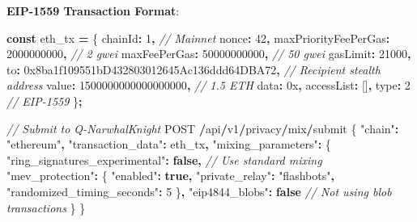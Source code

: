 \documentclass[
  11pt,
]{article}
\newenvironment{Shaded}{\begin{snugshade}}{\end{snugshade}}
\newcommand{\CommentTok}[1]{\textcolor[rgb]{0.56,0.35,0.01}{\textit{#1}}}
\newcommand{\DataTypeTok}[1]{\textcolor[rgb]{0.13,0.29,0.53}{#1}}
\newcommand{\DecValTok}[1]{\textcolor[rgb]{0.00,0.00,0.81}{#1}}
\newcommand{\KeywordTok}[1]{\textcolor[rgb]{0.13,0.29,0.53}{\textbf{#1}}}
\newcommand{\NormalTok}[1]{#1}
\newcommand{\OperatorTok}[1]{\textcolor[rgb]{0.81,0.36,0.00}{\textbf{#1}}}
\newcommand{\StringTok}[1]{\textcolor[rgb]{0.31,0.60,0.02}{#1}}
\begin{document}
\textbf{EIP-1559 Transaction Format}:

\begin{Shaded}
\begin{Highlighting}[]
\KeywordTok{const}\NormalTok{ eth\_tx }\OperatorTok{=}\NormalTok{ \{}
  \DataTypeTok{chainId}\OperatorTok{:} \DecValTok{1}\OperatorTok{,}  \CommentTok{// Mainnet}
  \DataTypeTok{nonce}\OperatorTok{:} \DecValTok{42}\OperatorTok{,}
  \DataTypeTok{maxPriorityFeePerGas}\OperatorTok{:} \StringTok{\textquotesingle{}2000000000\textquotesingle{}}\OperatorTok{,}  \CommentTok{// 2 gwei}
  \DataTypeTok{maxFeePerGas}\OperatorTok{:} \StringTok{\textquotesingle{}50000000000\textquotesingle{}}\OperatorTok{,}         \CommentTok{// 50 gwei}
  \DataTypeTok{gasLimit}\OperatorTok{:} \StringTok{\textquotesingle{}21000\textquotesingle{}}\OperatorTok{,}
  \DataTypeTok{to}\OperatorTok{:} \StringTok{\textquotesingle{}0x8ba1f109551bD432803012645Ac136ddd64DBA72\textquotesingle{}}\OperatorTok{,}  \CommentTok{// Recipient stealth address}
  \DataTypeTok{value}\OperatorTok{:} \StringTok{\textquotesingle{}1500000000000000000\textquotesingle{}}\OperatorTok{,}  \CommentTok{// 1.5 ETH}
  \DataTypeTok{data}\OperatorTok{:} \StringTok{\textquotesingle{}0x\textquotesingle{}}\OperatorTok{,}
  \DataTypeTok{accessList}\OperatorTok{:}\NormalTok{ []}\OperatorTok{,}
  \DataTypeTok{type}\OperatorTok{:} \DecValTok{2}  \CommentTok{// EIP{-}1559}
\NormalTok{\}}\OperatorTok{;}

\CommentTok{// Submit to Q{-}NarwhalKnight}
\NormalTok{POST }\OperatorTok{/}\NormalTok{api}\OperatorTok{/}\NormalTok{v1}\OperatorTok{/}\NormalTok{privacy}\OperatorTok{/}\NormalTok{mix}\OperatorTok{/}\NormalTok{submit}
\NormalTok{\{}
  \StringTok{"chain"}\OperatorTok{:} \StringTok{"ethereum"}\OperatorTok{,}
  \StringTok{"transaction\_data"}\OperatorTok{:}\NormalTok{ eth\_tx}\OperatorTok{,}
  \StringTok{"mixing\_parameters"}\OperatorTok{:}\NormalTok{ \{}
    \StringTok{"ring\_signatures\_experimental"}\OperatorTok{:} \KeywordTok{false}\OperatorTok{,}  \CommentTok{// Use standard mixing}
    \StringTok{"mev\_protection"}\OperatorTok{:}\NormalTok{ \{}
      \StringTok{"enabled"}\OperatorTok{:} \KeywordTok{true}\OperatorTok{,}
      \StringTok{"private\_relay"}\OperatorTok{:} \StringTok{"flashbots"}\OperatorTok{,}
      \StringTok{"randomized\_timing\_seconds"}\OperatorTok{:} \DecValTok{5}
\NormalTok{    \}}\OperatorTok{,}
    \StringTok{"eip4844\_blobs"}\OperatorTok{:} \KeywordTok{false}  \CommentTok{// Not using blob transactions}
\NormalTok{  \}}
\NormalTok{\}}
\end{Highlighting}
\end{Shaded}
\end{document}
